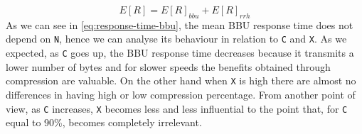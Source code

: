 \documentclass[11pt,a4paper,oneside, openright]{article}
\begin{document}
\begin{equation}
E[R] = E[R]_{bbu} + E[R]_{rrh}
\end{equation} 
As we can see in \ref{eq:response-time-bbu}, the mean BBU response time does not depend on \texttt{N}, hence we can analyse its behaviour in relation to \texttt{C} and \texttt{X}.
As we expected, as \texttt{C} goes up, the BBU response time decreases because it transmits a lower number of bytes and for slower speeds the benefits obtained through compression are valuable. On the other hand when \texttt{X} is high there are almost no differences in having high or low compression percentage. %
From another point of view, as \texttt{C} increases, \texttt{X} becomes less and less influential to the point that, for \texttt{C} equal to 90\%, becomes completely irrelevant.
\end{document}
